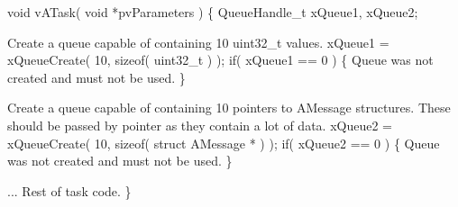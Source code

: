 \begin{DoxyPre} void vATask( void *pvParameters )
 \{
 QueueHandle\_t xQueue1, xQueue2;\end{DoxyPre}



\begin{DoxyPre}Create a queue capable of containing 10 uint32\_t values.
    xQueue1 = xQueueCreate( 10, sizeof( uint32\_t ) );
    if( xQueue1 == 0 )
    \{
Queue was not created and must not be used.
    \}\end{DoxyPre}



\begin{DoxyPre}Create a queue capable of containing 10 pointers to AMessage structures.
These should be passed by pointer as they contain a lot of data.
    xQueue2 = xQueueCreate( 10, sizeof( struct AMessage * ) );
    if( xQueue2 == 0 )
    \{
Queue was not created and must not be used.
    \}\end{DoxyPre}



\begin{DoxyPre}... Rest of task code.
 \}
 \end{DoxyPre}
 